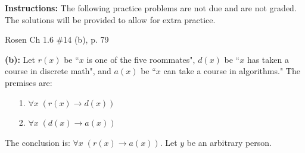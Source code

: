 \documentclass[12pt,addpoints]{exam}
\begin{document}
\extrawidth{0.5in} \extrafootheight{-0.75in} \pagestyle{headandfoot}
\headrule {} \footrule {}

\noindent \textbf{Instructions:} The following practice problems are
not due and are not graded.  The solutions will be provided to allow
for extra practice.


\begin{questions}

\printanswers

\question Rosen Ch 1.6 \#14 (b), p. 79

    \begin{solution}
    \textbf{(b):} Let $r(x)$ be ``$x$ is one of the five roommates", $d(x)$ be ``$x$ has taken a course in discrete math", and $a(x)$ be ``$x$ can take a course in algorithms." The premises are:
    \begin{itemize}
        \item[1.] $\forall x\;(r(x) \rightarrow d(x))$
        \item[2.] $\forall x\;(d(x) \rightarrow a(x))$
    \end{itemize}
    The conclusion is: $\forall x\;(r(x) \rightarrow a(x))$.  Let $y$ be an arbitrary person.


\end{solution}
\end{questions}
\end{document}
